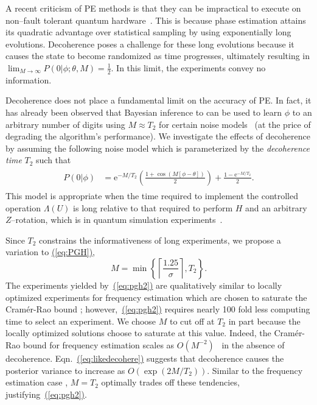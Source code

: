 \documentclass[aps,pra,amsmath,twocolumn,amssymb,superscriptaddress]{revtex4-1}
\newcommand{\eq}[1]{\hyperref[eq:#1]{(\ref*{eq:#1})}}
\newcommand{\ee}{\mathrm{e}}
\begin{document}
A recent criticism of PE methods is that they can be impractical to execute on non--fault tolerant quantum hardware~\cite{PMS+14,MBL+14,WHT15}.  This is because phase estimation attains its quadratic advantage over statistical sampling by using exponentially long evolutions.  Decoherence poses a challenge for these long evolutions because it causes the state to become randomized as time progresses, ultimately resulting in
$\lim_{M\rightarrow \infty} P(0|\phi;\theta,M) = \frac{1}{2}$.
In this limit, the experiments convey no information. 

Decoherence does not place a fundamental limit on the accuracy of PE.   In fact, it has already been observed that Bayesian inference to can be used to learn $\phi$ to an arbitrary number of digits using $M \approx T_2$ for certain noise models~\cite{granade_robust_2012} (at the price of degrading the algorithm's performance).
We investigate the effects of decoherence by assuming the following noise model which is parameterized by the \emph{decoherence time} $T_2$ such that
\begin{gather}
    \label{eq:likedecohere}
    \begin{aligned}
        P(0|\phi) & = \ee^{-M/T_2}\left(\frac{1+\cos(M[\phi -\theta])}{2}\right)+\frac{1-\ee^{-M/T_2}}{2}.
    \end{aligned}
\end{gather}
This model is appropriate when the time required to implement the controlled operation $\Lambda(U)$ is long relative to that required to perform $H$ and an arbitrary $Z$--rotation,
which is in quantum simulation experiments~\cite{hastings2015improving,wecker2015solving,mcclean2014exploiting}.

 

Since $T_2$ constrains the informativeness of long experiments, we propose a variation to \eq{PGH},
\begin{equation}
    \label{eq:pgh2}
    M = \min\left\{\left\lceil\frac{1.25}{\sigma}\right\rceil, T_2 \right\}.
\end{equation}
The experiments yielded by~\eq{pgh2} are qualitatively similar to locally optimized experiments for frequency estimation which are chosen to saturate the Cram\'er-Rao bound \cite{ferrie_how_2013}; however,~\eq{pgh2} requires nearly 100 fold less computing time to select an experiment.
We choose $M$ to cut off at $T_2$ in part because the locally optimized solutions choose to saturate at this value. Indeed, the Cram\'er-Rao bound for frequency estimation scales as $O(M^{-2})$~\cite{WGC15} in the absence of decoherence.  Eqn.~\eq{likedecohere} suggests that decoherence causes the posterior variance to increase as $O(\exp(2M/T_2))$.  Similar to the frequency estimation case \cite{ferrie_how_2013}, $M=T_2$ optimally trades off these tendencies, justifying~\eq{pgh2}.
\end{document}
